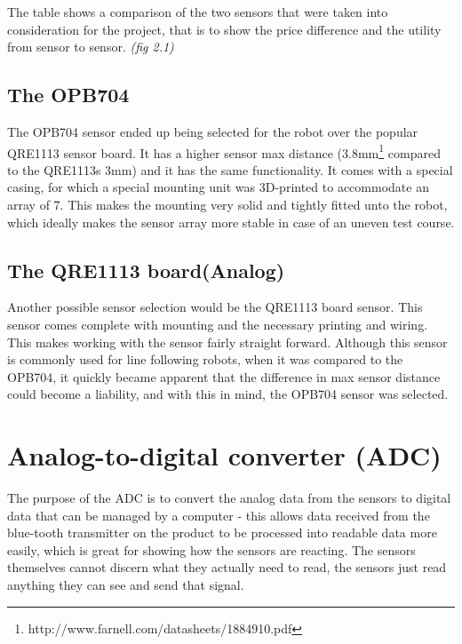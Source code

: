 The table shows a comparison of the two sensors that were taken into consideration for the project, that is to show the price difference and the utility from sensor to sensor. \emph{(fig 2.1)}



\subsection{The OPB704}

The OPB704 sensor ended up being selected for the robot over the popular QRE1113 sensor board. It has a higher sensor max distance (3.8mm\footnote{http://www.farnell.com/datasheets/1884910.pdf} compared to the QRE1113s 3mm) and it has the same functionality. It comes with a special casing, for which a special mounting unit was 3D-printed to accommodate an array of 7. This makes the mounting very solid and tightly fitted unto the robot, which ideally makes the sensor array more stable in case of an uneven test course.


\subsection{The QRE1113 board(Analog)}

Another possible sensor selection would be the QRE1113 board sensor. This sensor comes complete with mounting and the necessary printing and wiring. This makes working with the sensor fairly straight forward. Although this sensor is commonly used for line following robots, when it was compared to the OPB704, it quickly became apparent that the difference in max sensor distance could become a liability, and with this in mind, the OPB704 sensor was selected.




\section{Analog-to-digital converter (ADC)}

The purpose of the ADC is to convert the analog data from the sensors to digital data that can be managed by a computer - this allows data received from the blue-tooth transmitter on the product to be processed into readable data more easily, which is great for showing how the sensors are reacting. The sensors themselves cannot discern what they actually need to read, the sensors just read anything they can see and send that signal.

